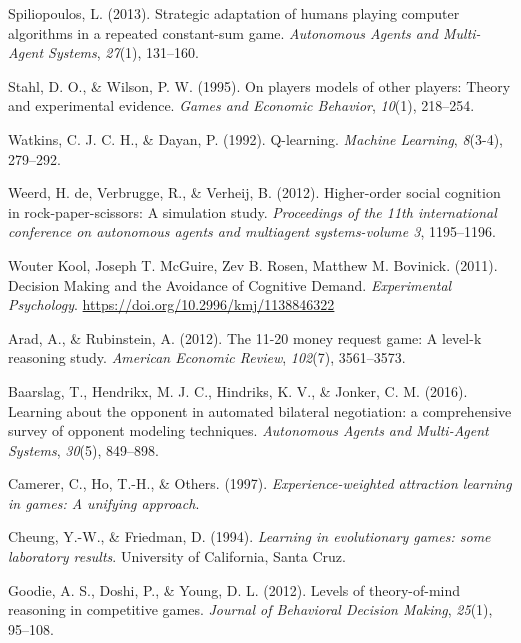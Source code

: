 \documentclass[man,floatsintext]{apa6}
\begin{document}
\leavevmode\hypertarget{ref-spiliopoulos2013strategic}{}%
Spiliopoulos, L. (2013). Strategic adaptation of humans playing computer algorithms in a repeated constant-sum game. \emph{Autonomous Agents and Multi-Agent Systems}, \emph{27}(1), 131--160.

\leavevmode\hypertarget{ref-stahl1995players}{}%
Stahl, D. O., \& Wilson, P. W. (1995). On players models of other players: Theory and experimental evidence. \emph{Games and Economic Behavior}, \emph{10}(1), 218--254.

\leavevmode\hypertarget{ref-watkins1992q}{}%
Watkins, C. J. C. H., \& Dayan, P. (1992). Q-learning. \emph{Machine Learning}, \emph{8}(3-4), 279--292.

\leavevmode\hypertarget{ref-de2012higher}{}%
Weerd, H. de, Verbrugge, R., \& Verheij, B. (2012). Higher-order social cognition in rock-paper-scissors: A simulation study. \emph{Proceedings of the 11th international conference on autonomous agents and multiagent systems-volume 3}, 1195--1196.

\leavevmode\hypertarget{ref-Kool_2011}{}%
Wouter Kool, Joseph T. McGuire, Zev B. Rosen, Matthew M. Bovinick. (2011). Decision Making and the Avoidance of Cognitive Demand. \emph{Experimental Psychology}. \url{https://doi.org/10.2996/kmj/1138846322}

\leavevmode\hypertarget{ref-arad201211}{}%
Arad, A., \& Rubinstein, A. (2012). The 11-20 money request game: A level-k reasoning study. \emph{American Economic Review}, \emph{102}(7), 3561--3573.

\leavevmode\hypertarget{ref-baarslag2016learning}{}%
Baarslag, T., Hendrikx, M. J. C., Hindriks, K. V., \& Jonker, C. M. (2016). Learning about the opponent in automated bilateral negotiation: a comprehensive survey of opponent modeling techniques. \emph{Autonomous Agents and Multi-Agent Systems}, \emph{30}(5), 849--898.

\leavevmode\hypertarget{ref-camerer1997experience}{}%
Camerer, C., Ho, T.-H., \& Others. (1997). \emph{Experience-weighted attraction learning in games: A unifying approach}.

\leavevmode\hypertarget{ref-cheung1994learning}{}%
Cheung, Y.-W., \& Friedman, D. (1994). \emph{Learning in evolutionary games: some laboratory results}. University of California, Santa Cruz.

\leavevmode\hypertarget{ref-goodie2012levels}{}%
Goodie, A. S., Doshi, P., \& Young, D. L. (2012). Levels of theory-of-mind reasoning in competitive games. \emph{Journal of Behavioral Decision Making}, \emph{25}(1), 95--108.
\end{document}

